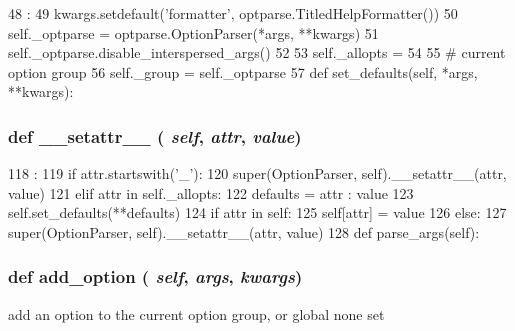 \begin{DoxyCode}
48                                        :
49         kwargs.setdefault('formatter', optparse.TitledHelpFormatter())
50         self._optparse = optparse.OptionParser(*args, **kwargs)
51         self._optparse.disable_interspersed_args()
52 
53         self._allopts = {}
54 
55         # current option group
56         self._group = self._optparse
57 
    def set_defaults(self, *args, **kwargs):
\end{DoxyCode}
\hypertarget{classm5_1_1options_1_1OptionParser_a6287b7a16286568d5442b6e2e90215b5}{
\subsubsection[{\_\-\_\-setattr\_\-\_\-}]{\setlength{\rightskip}{0pt plus 5cm}def \_\-\_\-setattr\_\-\_\- ( {\em self}, \/   {\em attr}, \/   {\em value})}}
\label{classm5_1_1options_1_1OptionParser_a6287b7a16286568d5442b6e2e90215b5}



\begin{DoxyCode}
118                                       :
119         if attr.startswith('_'):
120             super(OptionParser, self).__setattr__(attr, value)
121         elif attr in self._allopts:
122             defaults = { attr : value }
123             self.set_defaults(**defaults)
124             if attr in self:
125                 self[attr] = value
126         else:
127             super(OptionParser, self).__setattr__(attr, value)
128 
    def parse_args(self):
\end{DoxyCode}
\hypertarget{classm5_1_1options_1_1OptionParser_ad3eee4a96db4c61670bde07b2af08320}{
\subsubsection[{add\_\-option}]{\setlength{\rightskip}{0pt plus 5cm}def add\_\-option ( {\em self}, \/   {\em args}, \/   {\em kwargs})}}
\label{classm5_1_1options_1_1OptionParser_ad3eee4a96db4c61670bde07b2af08320}
\begin{DoxyVerb}add an option to the current option group, or global none set\end{DoxyVerb}
 


